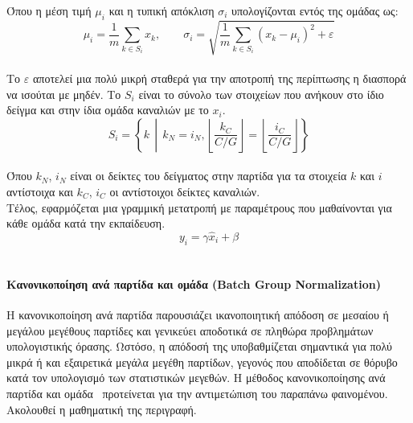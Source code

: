 \documentclass[12pt]{article}
\numberwithin{equation}{section}
\begin{document}
\noindent Όπου η μέση τιμή \(\mu_i\) και η τυπική απόκλιση \(\sigma_i\) υπολογίζονται εντός της ομάδας ως:\\

\begin{equation}
\mu_i = \frac{1}{m} \sum_{k \in S_i} x_k, \qquad 
\sigma_i = \sqrt{\frac{1}{m} \sum_{k \in S_i} (x_k - \mu_i)^2 + \varepsilon}
\end{equation}\\

\noindent Το \( \varepsilon \) αποτελεί μια πολύ μικρή σταθερά για την αποτροπή της περίπτωσης η διασπορά να ισούται με μηδέν. Το \(S_i\) είναι το σύνολο των στοιχείων που ανήκουν στο ίδιο δείγμα και στην ίδια ομάδα καναλιών με το \(x_i\). \\

\begin{equation}
S_i = \left\{ k \,\middle|\, k_N = i_N, \left\lfloor \frac{k_C}{C/G} \right\rfloor = \left\lfloor \frac{i_C}{C/G} \right\rfloor \right\}
\end{equation}\\

\noindent Όπου \(k_N\), \(i_N\) είναι οι δείκτες του δείγματος στην παρτίδα για τα στοιχεία \(k\) και \(i\) αντίστοιχα και \(k_C\), \(i_C\) οι αντίστοιχοι δείκτες καναλιών.\\

\noindent Τέλος, εφαρμόζεται μια γραμμική μετατροπή με παραμέτρους που μαθαίνονται για κάθε ομάδα κατά την εκπαίδευση.\\

\begin{equation}
y_i = \gamma \hat{x}_i + \beta
\end{equation}\\

\paragraph{Κανονικοποίηση ανά παρτίδα και ομάδα (Batch Group Normalization)\\ [0.5cm]}

Η κανονικοποίηση ανά παρτίδα παρουσιάζει ικανοποιητική απόδοση σε μεσαίου ή μεγάλου μεγέθους παρτίδες και γενικεύει αποδοτικά σε πληθώρα προβλημάτων υπολογιστικής όρασης. Ωστόσο, η απόδοσή της υποβαθμίζεται σημαντικά για πολύ μικρά ή και εξαιρετικά μεγάλα μεγέθη παρτίδων, γεγονός που αποδίδεται σε θόρυβο κατά τον υπολογισμό των στατιστικών μεγεθών. Η μέθοδος κανονικοποίησης ανά παρτίδα και ομάδα~\cite{zhou2020batchgroupnormalization} προτείνεται για την αντιμετώπιση του παραπάνω φαινομένου. Ακολουθεί η μαθηματική της περιγραφή.\\
\end{document}
